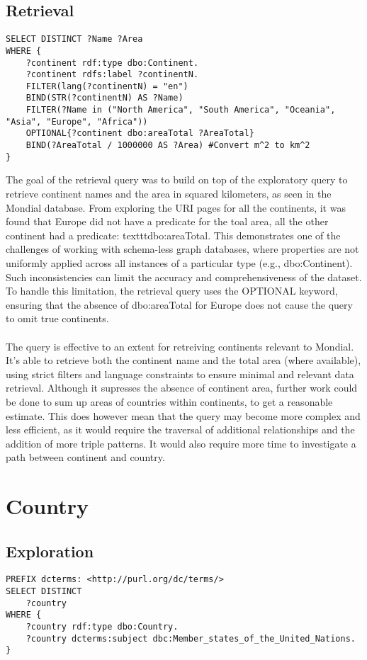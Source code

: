 \documentclass[11pt]{article}
\begin{document}
\subsection{Retrieval}

{\footnotesize\begin{verbatim}
SELECT DISTINCT ?Name ?Area
WHERE {
    ?continent rdf:type dbo:Continent.
    ?continent rdfs:label ?continentN.
    FILTER(lang(?continentN) = "en")
    BIND(STR(?continentN) AS ?Name)
    FILTER(?Name in ("North America", "South America", "Oceania", "Asia", "Europe", "Africa"))
    OPTIONAL{?continent dbo:areaTotal ?AreaTotal}
    BIND(?AreaTotal / 1000000 AS ?Area) #Convert m^2 to km^2
}
\end{verbatim}}

The goal of the retrieval query was to build on top of the exploratory query to retrieve continent names and the area in squared kilometers, as seen in the Mondial database. From exploring the URI pages for all the
continents, it was found that Europe did not have a predicate for the toal area, all the other continent had a predicate: texttt{dbo:areaTotal}.
This demonstrates one of the challenges of working with schema-less graph databases, where properties are not uniformly applied across all instances of a particular type
(e.g., dbo:Continent). Such inconsistencies can limit the accuracy and comprehensiveness of the dataset.
To handle this limitation, the retrieval query uses the OPTIONAL keyword, ensuring that the absence of dbo:areaTotal for Europe does not cause the query to omit true continents.
\\ \\
The query is effective to an extent for retreiving continents relevant to Mondial. It's able to retrieve both the continent name and the total area (where available), using strict
filters and language constraints to ensure minimal and relevant data retrieval. Although it supresses the absence of continent area, further work could be done to sum up areas of countries within 
continents, to get a reasonable estimate. This does however mean that the query may become more complex and less efficient, as it would require the traversal of additional relationships and
the addition of more triple patterns. It would also require more time to investigate a path between continent and country.

\section{Country}
\subsection{Exploration}
{\footnotesize\begin{verbatim}
PREFIX dcterms: <http://purl.org/dc/terms/>
SELECT DISTINCT 
    ?country
WHERE {
    ?country rdf:type dbo:Country. 
    ?country dcterms:subject dbc:Member_states_of_the_United_Nations. 
}
\end{verbatim}}
\end{document}
